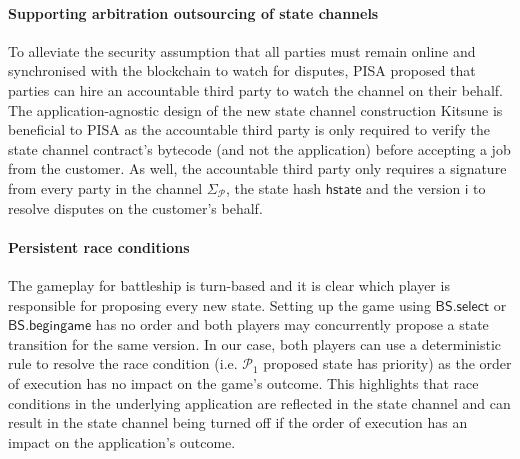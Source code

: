 \documentclass{llncs}
\newcommand{\hstate}{\mathsf{hstate}}
\newcommand{\monotoniccounter}{\mathsf{i}}
\newcommand{\participant}{\mathcal{P}}
\newcommand{\battleshipbegin}{\mathsf{BS.begingame}}
\newcommand{\battleshipselectboard}{\mathsf{BS.select}}
\newcommand{\timerchallenge}{\mathsf{\Delta}_{\mathsf{challenge}}}
\newcommand{\timechallenge}{\mathsf{t}_{\mathsf{challenge}}}
\newcommand{\timerextra}{\mathsf{\Delta}_{\mathsf{extra}}}
\newcommand{\timerdispute}{\mathsf{\Delta}_{\mathsf{dispute}}}
\begin{document}
	
	
	
	\paragraph{Supporting arbitration outsourcing of state channels} 
	To alleviate the security assumption that all parties must remain online and synchronised with the blockchain to watch for disputes, PISA \cite{mccorry2018pisa} proposed that parties can hire an accountable third party to watch the channel on their behalf. 
	The application-agnostic design of the new state channel construction \textsf{Kitsune} is beneficial to PISA as the accountable third party is only required to verify the state channel contract's bytecode (and not the application) before accepting a job from the customer. 
	As well,  the accountable third party only requires a signature from every party in the channel $\Sigma_{\participant}$, the state hash $\hstate$ and the version $\monotoniccounter$ to resolve disputes on the customer's behalf. 
	
	\paragraph{Persistent race conditions} 
	The gameplay for battleship is turn-based and it is clear which player is responsible for proposing every new state. 
	Setting up the game using $\battleshipselectboard$ or $\battleshipbegin$ has no order and both players may concurrently propose a state transition for the same version. 
	In our case, both players can use a deterministic rule to resolve the race condition (i.e. $\participant_{1}$ proposed state has priority) as the order of execution has no impact on the game's outcome. 
	This highlights that race conditions in the underlying application are reflected in the state channel and can result in the state channel being turned off if the order of execution has an impact on the application's outcome. 
\end{document}
